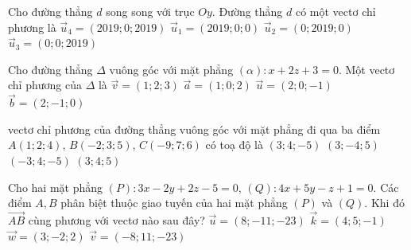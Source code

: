 \begin{ex}
	Cho đường thẳng $d$ song song với trục $Oy$. Đường thẳng $d$ có một vectơ chỉ phương là
	\choice
	{$\overrightarrow{u}_4=(2019;0;2019)$}
	{$\overrightarrow{u}_1=(2019;0;0)$}
	{\True $\overrightarrow{u}_2=(0;2019;0)$}
	{$\overrightarrow{u}_3=(0;0;2019)$}
\end{ex}

\begin{ex}%
	Cho đường thẳng $\Delta$ vuông góc với mặt phẳng $(\alpha) \colon x+2z+3=0$. Một vectơ chỉ phương của $\Delta$ là
	\choice
	{$\overrightarrow{v}=(1;2;3)$}
	{\True $\overrightarrow{a}=(1;0;2)$}
	{$\overrightarrow{u}=(2;0;-1)$}
	{$\overrightarrow{b}=(2;-1;0)$}
\end{ex}

\begin{ex}%
	vectơ chỉ phương của đường thẳng vuông góc với mặt phẳng đi qua ba điểm $A(1;2;4)$, $B(-2;3;5)$, $C(-9;7;6)$ có toạ độ là
	\choice
	{$(3;4;-5)$}
	{$(3;-4;5)$}
	{$(-3;4;-5)$}
	{\True $(3;4;5)$}
\end{ex}

\begin{ex}%
	Cho hai mặt phẳng $(P): 3x-2y+2z-5=0$, $(Q): 4x+5y-z+1=0$. Các điểm $A, B$ phân biệt thuộc giao tuyến của hai mặt phẳng $(P)$ và $(Q)$. Khi đó $\overrightarrow{AB}$ cùng phương với vectơ nào sau đây?
	\choice
	{\True $\overrightarrow{u}=(8;-11;-23)$}
	{$\overrightarrow{k}=(4;5;-1)$}
	{$\overrightarrow{w}=(3;-2;2)$}
	{$\overrightarrow{v}=(-8;11;-23)$}
\end{ex}

